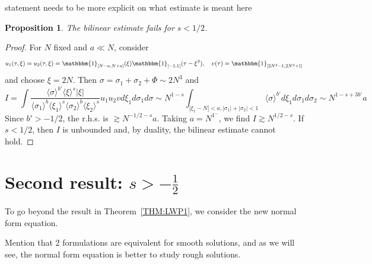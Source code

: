 \documentclass[a4paper, 11pt]{amsart}
\newcommand{\jap}[1]{\langle #1 \rangle}
\theoremstyle{plain}
\newtheorem{prop}[thm]{Proposition}
\theoremstyle{definition}
\theoremstyle{remark}
\newcommand{\5}{\text{V}}
\numberwithin{equation}{section}
\theoremstyle{mytheoremstyle} \newtheorem{nota}[thm]{Remark}
\theoremstyle{mytheoremstyle} \newtheorem{exemplo}[thm]{Example}
\newcommand{\red}{\color{red}}
\newcommand{\blue}{\color{blue}}
\begin{document}
{\red statement needs to be more explicit on what estimate is meant here}
\begin{prop}
    The {\red bilinear estimate} fails for $s<1/2$.
\end{prop}
\begin{proof}
\blue
    For $N$ fixed and $a\ll N$, consider
    $$
    u_1(\tau,\xi)=u_2(\tau,\xi)=\mathbbm{1}_{[N-a,N+a]}(\xi)\mathbbm{1}_{[-1,1]}(\tau-\xi^3),\quad v(\tau)=\mathbbm{1}_{[2N^3-1, 2N^3+1]}
    $$
    and choose $\xi=2N$. Then $\sigma=\sigma_1+\sigma_2+\Phi \sim 2N^3$ and
    $$
    I=\int \frac{\jap{\sigma}^{b'}\jap{\xi}^s|\xi|}{\jap{\sigma_1}^b\jap{\xi_1}^s\jap{\sigma_2}^b\jap{\xi_2}^s}u_1u_2v d\xi_1 d\sigma_1 d\sigma \sim N^{1-s} \int_{|\xi_1-N|<a, |\sigma_1|+|\sigma_2|<1} \jap{\sigma}^{b'}d\xi_1 d\sigma_1 d\sigma_2 \sim N^{1-s+3b'}a
    $$
    Since $b'>-1/2$, the r.h.s. is $\gtrsim N^{-1/2-s}a$. Taking $a=N^{1^-}$, we find $I\gtrsim N^{1/2-s}$. If $s<1/2$, then $I$ is unbounded and, by duality, the bilinear estimate cannot hold.
\end{proof}





\section{Second result: $s> - \frac12$}
To go beyond the result in Theorem~\ref{THM:LWP1}, we consider the new normal form equation.

{\red Mention that 2 formulations are equivalent for smooth solutions, and as we will see, the normal form equation is better to study rough solutions.}
\end{document}
